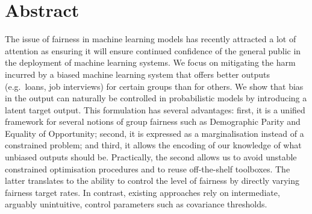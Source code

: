 \section{Abstract}

%
The issue of fairness in machine learning models has recently attracted a lot of attention as ensuring it will ensure continued confidence of the general public in the deployment of machine learning systems.
We focus on mitigating the harm incurred by a biased machine learning system
that offers better outputs (e.g.\ loans, job interviews) for certain groups than for others.
We show that bias in the output can naturally be controlled in probabilistic models
by introducing a latent target output. 
This formulation has several advantages:
first, it is a unified framework for several notions of group fairness such as Demographic Parity and Equality of Opportunity;
second, it is expressed as a marginalisation instead of a constrained problem;
and third, it allows the encoding of our knowledge of what unbiased outputs should be.
%
Practically, the second allows us to avoid unstable constrained optimisation procedures and to reuse off-the-shelf toolboxes.
%
The latter translates to the ability to control the level of fairness by
directly varying fairness target rates. %
In contrast, existing approaches rely on intermediate, arguably unintuitive, control parameters such as covariance thresholds.


